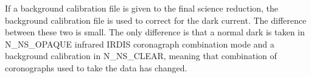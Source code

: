 \documentclass[twoside,single]{lion-msc}
\begin{document}
If a background calibration file is given to the final science reduction, the background calibration file is used to correct for the dark current. The difference between these two is small. The only difference is that a normal dark is taken in N\_NS\_OPAQUE infrared IRDIS coronagraph combination mode and a background calibration in N\_NS\_CLEAR, meaning that combination of coronographs used to take the data has changed\cite{Mouillet2013}.

\end{document}
